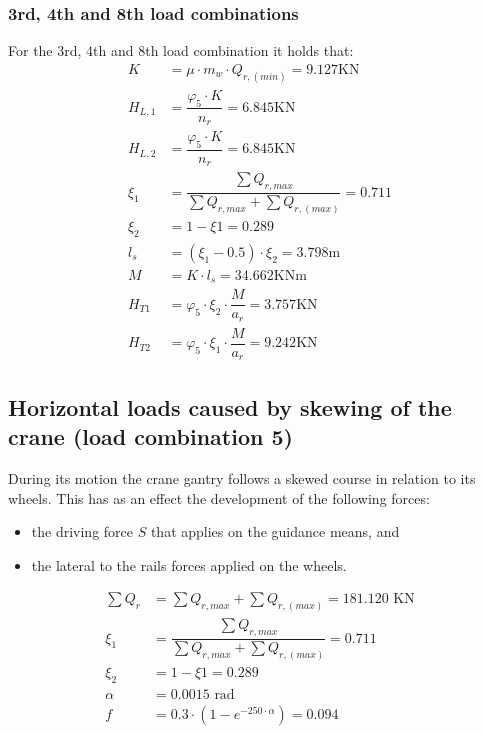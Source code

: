 \documentclass[a4paper,10pt, final, oneside, fleqn, onecolumn]{article}	%
\begin{document}
\subsubsection{3rd, 4th and 8th load combinations}

For the 3rd, 4th and 8th load combination it holds that:
\begin{align*}
    K         &= μ \cdot m_w \cdot Q_{r,(min)}  = 9.127 \text{KN} \\
    H_{L,1}   &= \dfrac{φ_5 \cdot K} {n_r} = 6.845 \text{KN} \\
    H_{L,2}   &= \dfrac{φ_5 \cdot K} {n_r} = 6.845 \text{KN} \\
    ξ_1       &= \dfrac{\displaystyle\sum{Q_{r,max}}}{\displaystyle\sum{Q_{r,max} + \displaystyle\sum{Q_{r,(max)}}}} = 0.711 \\
    ξ_2       &= 1 - ξ1 = 0.289 \\
    l_s       &= (ξ_1 - 0.5) \cdot ξ_2 = 3.798 \text{m} \\
    M         &= K \cdot l_s = 34.662 \text{KNm} \\
    H_{T1}    &= φ_5 \cdot ξ_2 \cdot \dfrac{M}{a_r} = 3.757 \text{KN} \\
    H_{T2}    &= φ_5 \cdot ξ_1 \cdot \dfrac{M}{a_r} = 9.242 \text{KN}
\end{align*}


\subsection{Horizontal loads caused by skewing of the crane (load combination 5)}

During its motion the crane gantry follows a skewed course in relation to its wheels. This has as an 
effect the development of the following forces:

\begin{itemize}
    \item the driving force $S$ that applies on the guidance means, and
    \item the lateral to the rails forces applied on the wheels.
\end{itemize}

\begin{align*}
    \sum{Q_r} &= \displaystyle\sum{Q_{r,max}} + \displaystyle\sum{Q_{r,(max)}} = 181.120 \text{ KN} \\
    \xi_1     &= \dfrac{\displaystyle\sum{Q_{r,max}}}{\displaystyle\sum{Q_{r,max}} + \displaystyle\sum{Q_{r,(max)}}} = 0.711 \\
    \xi_2     &= 1 - \xi1 = 0.289\\
    \alpha    &= 0.0015 \text{ rad} \\
    f         &= 0.3 \cdot \left(1 - e^{-250 \cdot \alpha}\right) = 0.094
\end{align*}
\end{document}
